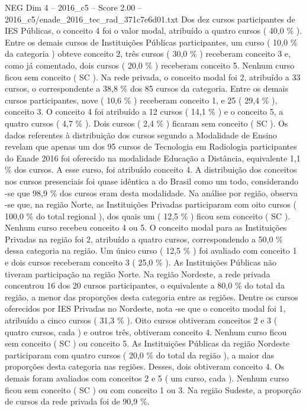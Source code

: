 \begin{textsample}{NEG Dim 4 – 2016\_c5 – Score 2.00 – 2016\_c5/enade\_2016\_tec\_rad\_371c7e6d01.txt}
Dos dez cursos participantes de IES Públicas, o conceito 4 foi o valor modal, atribuído a quatro cursos ( 40,0 \% ).
Entre os demais cursos de Instituições Públicas participantes, um curso ( 10,0 \% da categoria ) obteve conceito 2, três cursos ( 30,0 \% ) receberam conceito 3 e, como já comentado, dois cursos ( 20,0 \% ) receberam conceito 5.
Nenhum curso ficou sem conceito ( SC ).
Na rede privada, o conceito modal foi 2, atribuído a 33 cursos, o correspondente a 38,8 \% dos 85 cursos da categoria.
Entre os demais cursos participantes, nove ( 10,6 \% ) receberam conceito 1, e 25 ( 29,4 \% ), conceito 3.
O conceito 4 foi atribuído a 12 cursos ( 14,1 \% ) e o conceito 5, a quatro cursos ( 4,7 \% ).
Dois cursos ( 2,4 \% ) ficaram sem conceito ( SC ).
Os dados referentes à distribuição dos cursos segundo a Modalidade de Ensino revelam que apenas um dos 95 cursos de Tecnologia em Radiologia participantes do Enade 2016 foi oferecido na modalidade Educação a Distância, equivalente 1,1 \% dos cursos.
A esse curso, foi atribuído conceito 4.
A distribuição dos conceitos nos cursos presenciais foi quase idêntica a do Brasil como um todo, considerando -se que 98,9 \% dos cursos eram desta modalidade.
Na análise por região, observa -se que, na região Norte, as Instituições Privadas participaram com oito cursos ( 100,0 \% do total regional ), dos quais um ( 12,5 \% ) ficou sem conceito ( SC ).
Nenhum curso recebeu conceito 4 ou 5.
O conceito modal para as Instituições Privadas na região foi 2, atribuído a quatro cursos, correspondendo a 50,0 \% dessa categoria na região.
Um único curso ( 12,5 \% ) foi avaliado com conceito 1 e dois cursos receberam conceito 3 ( 25,0 \% ).
As Instituições Públicas não tiveram participação na região Norte.
Na região Nordeste, a rede privada concentrou 16 dos 20 cursos participantes, o equivalente a 80,0 \% do total da região, a menor das proporções desta categoria entre as regiões.
Dentre os cursos oferecidos por IES Privadas no Nordeste, nota -se que o conceito modal foi 1, atribuído a cinco cursos ( 31,3 \% ).
Oito cursos obtiveram conceitos 2 e 3 ( quatro cursos, cada ) e outros três, obtiveram conceito 4.
Nenhum curso ficou sem conceito ( SC ) ou conceito 5.
As Instituições Públicas da região Nordeste participaram com quatro cursos ( 20,0 \% do total da região ), a maior das proporções desta categoria nas regiões.
Desses, dois obtiveram conceito 4.
Os demais foram avaliados com conceitos 2 e 5 ( um curso, cada ).
Nenhum curso ficou sem conceito ( SC ) ou com conceito 1 ou 3.
Na região Sudeste, a proporção de cursos da rede privada foi de 90,9 \%.

\end{textsample}
